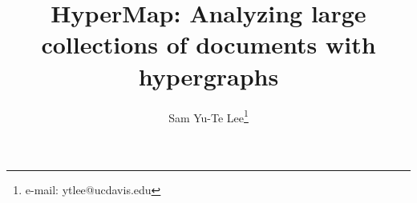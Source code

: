 \documentclass{vgtc}                          %
\title{HyperMap: Analyzing large collections of documents with hypergraphs}
\author{ Sam Yu-Te Lee\thanks{e-mail: ytlee@ucdavis.edu}\\ %
}
\affiliation{\scriptsize University of California, Davis}
\begin{document}


\maketitle













%

%
%
%



\pagebreak
\appendix %


\end{document}
